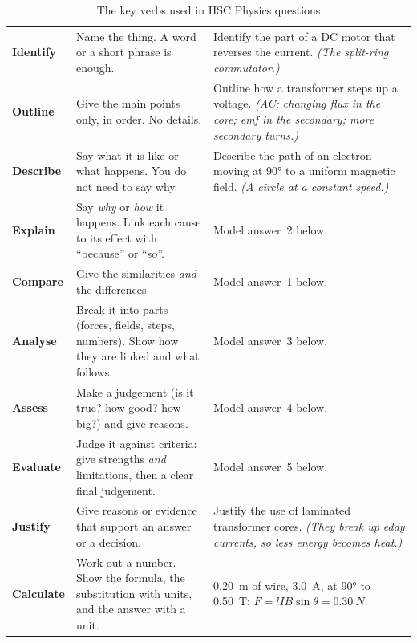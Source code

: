 \begin{table}
  \caption*{The key verbs used in HSC Physics questions}
  \centering
  \small
  \begin{tabular}{@{}L{19mm}L{58mm}L{64mm}@{}}
    \toprule
     &  & \\
    \midrule
    \textbf{Identify} & Name the thing. A word or a short phrase is enough.
      & Identify the part of a DC motor that reverses the current.
        \emph{(The split-ring commutator.)}\\
    \textbf{Outline} & Give the main points only, in order. No details.
      & Outline how a transformer steps up a voltage. \emph{(AC; changing flux in the
        core; emf in the secondary; more secondary turns.)}\\
    \textbf{Describe} & Say what it is like or what happens. You do not need to say why.
      & Describe the path of an electron moving at \ang{90} to a uniform magnetic field.
        \emph{(A circle at a constant speed.)}\\
    \textbf{Explain} & Say \emph{why} or \emph{how} it happens. Link each cause to its
      effect with ``because'' or ``so''.
      & Model answer~2 below.\\
    \textbf{Compare} & Give the similarities \emph{and} the differences.
      & Model answer~1 below.\\
    \textbf{Analyse} & Break it into parts (forces, fields, steps, numbers). Show how they
      are linked and what follows.
      & Model answer~3 below.\\
    \textbf{Assess} & Make a judgement (is it true? how good? how big?) and give reasons.
      & Model answer~4 below.\\
    \textbf{Evaluate} & Judge it against criteria: give strengths \emph{and} limitations,
      then a clear final judgement.
      & Model answer~5 below.\\
    \textbf{Justify} & Give reasons or evidence that support an answer or a decision.
      & Justify the use of laminated transformer cores. \emph{(They break up eddy
        currents, so less energy becomes heat.)}\\
    \textbf{Calculate} & Work out a number. Show the formula, the substitution with units,
      and the answer with a unit.
      & \qty{0.20}{m} of wire, \qty{3.0}{A}, at \ang{90} to \qty{0.50}{T}:
        $F = lIB\sin\theta = \qty{0.30}{N}$.\\
    \bottomrule
  \end{tabular}
\end{table}

